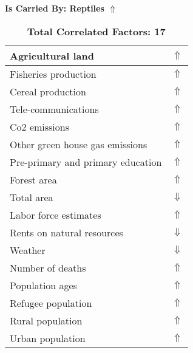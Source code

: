 \documentclass[12pt,notitlepage,oneside]{report}
\begin{document}
\clearpage
\begin{table}[!htb]
\caption{\textbf{Is Carried By: Reptiles $\Uparrow$}}
\centering
\label{Correlated Socio-economic Factors0}
\begin{tabular}{|l|l|}
\hline
Agricultural land & $\Uparrow$\\ \hline
Fisheries production & $\Uparrow$\\ \hline
Cereal production & $\Uparrow$\\ \hline
Tele-communications & $\Uparrow$\\ \hline
Co2 emissions & $\Uparrow$\\ \hline
Other green house gas emissions & $\Uparrow$\\ \hline
Pre-primary and primary education & $\Uparrow$\\ \hline
Forest area & $\Uparrow$\\ \hline
Total area & $\Downarrow$\\ \hline
Labor force estimates & $\Uparrow$\\ \hline
Rents on natural resources & $\Downarrow$\\ \hline
Weather & $\Downarrow$\\ \hline
Number of deaths & $\Uparrow$\\ \hline
Population ages & $\Uparrow$\\ \hline
Refugee population & $\Uparrow$\\ \hline
Rural population & $\Uparrow$\\ \hline
Urban population & $\Uparrow$\\ \hline
\end{tabular}
\caption*{\textbf{Total Correlated Factors: 17}}
\end{table}
\end{document}
